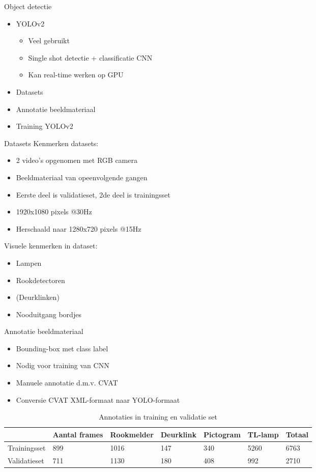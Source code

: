 \documentclass[11pt,t]{beamer}
\begin{document}
\begin{frame}[fragile]{Object detectie}
	\begin{itemize}
		\item YOLOv2
		\begin{itemize}
			\item Veel gebruikt
			\item Single shot detectie + classificatie CNN
			\item Kan real-time werken op GPU
		\end{itemize}

		\item Datasets
		\item Annotatie beeldmateriaal
		\item Training YOLOv2
	\end{itemize}
\end{frame}

\begin{frame}[fragile]{Datasets}
	Kenmerken datasets:
	\begin{itemize}
		\item 2 video's opgenomen met RGB camera
		\item Beeldmateriaal van opeenvolgende gangen
		\item Eerste deel is validatieset, 2de deel is trainingsset
		\item 1920x1080 pixels @30Hz
		\item Herschaald naar 1280x720 pixels @15Hz
	\end{itemize}

	Visuele kenmerken in dataset:
	\begin{itemize}
		\item Lampen
		\item Rookdetectoren
		\item (Deurklinken)
		\item Nooduitgang bordjes
	\end{itemize}
\end{frame}

\begin{frame}{Annotatie beeldmateriaal}
	\begin{itemize}
		\item Bounding-box met class label
		\item Nodig voor training van CNN
		\item Manuele annotatie d.m.v. CVAT
		\item Conversie CVAT XML-formaat naar YOLO-formaat
	\end{itemize}

	\begin{table}
		\tiny
		\caption{Annotaties in training en validatie set}
		\begin{tabular}{l | l | l | l | l | l | l}
			& Aantal frames & Rookmelder & Deurklink & Pictogram & TL-lamp & Totaal \\ \hline
			Trainingsset & 899 & 1016 & 147 & 340 & 5260 & 6763 \\
			Validatieset & 711 & 1130 & 180 & 408 & 992 & 2710 \\
		\end{tabular}
	\end{table}
\end{frame}
\end{document}
